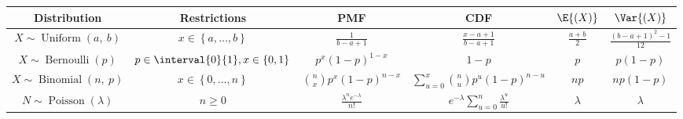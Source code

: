 \documentclass{article}
\begin{document}
\begin{table}[H]
    \centering
    \begin{tabular}{c c c c c c}
        \toprule
        \textbf{Distribution}                                      & \textbf{Restrictions}                                  & \textbf{PMF}                                              & \textbf{CDF}                                                             & \(\E{\left( X \right)}\)            & \(\Var{\left( X \right)}\)                    \\
        \midrule
        \(X \sim \operatorname{Uniform}{\left( a,\: b \right)}\)   & \(x \in \left\{ a, \dots, b \right\}\)                 & \(\frac{1}{b - a + 1}\)                                   & \(\frac{x - a + 1}{b - a + 1}\)                                          & \(\frac{a + b}{2}\)                 & \(\frac{\left( b - a + 1 \right)^2 - 1}{12}\) \\
        \(X \sim \operatorname{Bernoulli}{\left( p \right)}\)      & \(p \in \interval{0}{1}, x \in \left\{ 0, 1 \right\}\) & \(p^x \left( 1 - p \right)^{1 - x}\)                      & \(1 - p\)                                                                & \(p\)                               & \(p \left( 1 - p \right)\)                    \\
        \(X \sim \operatorname{Binomial}{\left( n,\: p \right)}\)  & \(x \in \left\{ 0, \dots, n \right\}\)                 & \(\binom{n}{x} p^x \left( 1 - p \right)^{n - x}\)         & \(\sum_{u = 0}^x \binom{n}{u} p^u \left( 1 - p \right)^{n - u}\)         & \(np\)                              & \(np\left( 1 - p \right)\)                    \\
        \( N \sim \operatorname{Poisson}{\left( \lambda \right)}\) & \(n \geq 0\)                                           & \(\frac{\lambda^n e^{-\lambda}}{n!}\)                     & \(e^{-\lambda} \sum_{u = 0}^n \frac{\lambda^u}{u!}\)                     & \(\lambda\)                         & \(\lambda\)                                   \\
        \bottomrule
    \end{tabular}
\end{table}
\end{document}
